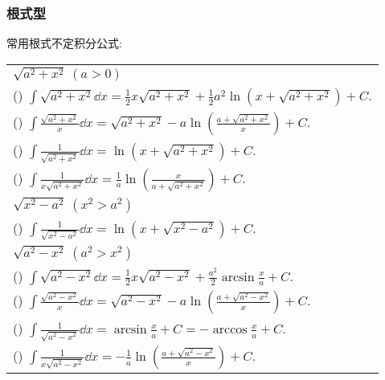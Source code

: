 \subsubsection{根式型}

常用根式不定积分公式:
\setcounter{magicrownumbers}{0}
\begin{table}[H]
    \centering
    \begin{tabular}{l}
        $\sqrt{a^2+x^2}~  (a>0)$                                                                                                                                 \\
        (\rownumber{}) $\displaystyle\int \sqrt{a^{2}+x^{2}} \dd  x=\frac{1}{2} x \sqrt{a^{2}+x^{2}}+\frac{1}{2} a^{2} \ln \left(x+\sqrt{a^{2}+x^{2}}\right)+C.$ \\
        (\rownumber{}) $\displaystyle\int \frac{\sqrt{a^{2}+x^{2}}}{x} \dd  x=\sqrt{a^{2}+x^{2}}-a \ln \left(\frac{a+\sqrt{a^{2}+x^{2}}}{x}\right)+C.$           \\
        (\rownumber{}) $\displaystyle\int \frac{1}{\sqrt{a^{2}+x^{2}}} \dd  x=\ln \left(x+\sqrt{a^{2}+x^{2}}\right)+C .$                                         \\
        (\rownumber{}) $\displaystyle\int \frac{1}{x \sqrt{a^{2}+x^{2}}} \dd  x=\frac{1}{a} \ln \left(\frac{x}{a+\sqrt{a^{2}+x^{2}}}\right)+C .$                 \\
        \midrule
        $\sqrt{x^{2}-a^{2}} ~ \left(x^{2}>a^{2}\right)$                                                                                                          \\
        (\rownumber{}) $\displaystyle\int \frac{1}{\sqrt{x^{2}-a^{2}}} \dd  x=\ln \left(x+\sqrt{x^{2}-a^{2}}\right)+C.$                                          \\
        \midrule
        $\sqrt{a^{2}-x^{2}} ~ \left(a^{2}>x^{2}\right)$                                                                                                          \\
        (\rownumber{}) $\displaystyle\int \sqrt{a^{2}-x^{2}} \dd  x=\frac{1}{2} x \sqrt{a^{2}-x^{2}}+\frac{a^{2}}{2} \arcsin \frac{x}{a}+C.$                     \\
        (\rownumber{}) $\displaystyle\int \frac{\sqrt{a^{2}-x^{2}}}{x} \dd  x=\sqrt{a^{2}-x^{2}}-a \ln \left(\frac{a+\sqrt{a^{2}-x^{2}}}{x}\right)+C.$           \\
        (\rownumber{}) $\displaystyle\int \frac{1}{\sqrt{a^{2}-x^{2}}} \dd  x=\arcsin \frac{x}{a}+C=-\arccos \frac{x}{a}+C.$                                     \\
        (\rownumber{}) $\displaystyle\int \frac{1}{x \sqrt{a^{2}-x^{2}}} \dd  x=-\frac{1}{a} \ln \left(\frac{a+\sqrt{a^{2}-x^{2}}}{x}\right)+C.$                 \\
    \end{tabular}
\end{table}

